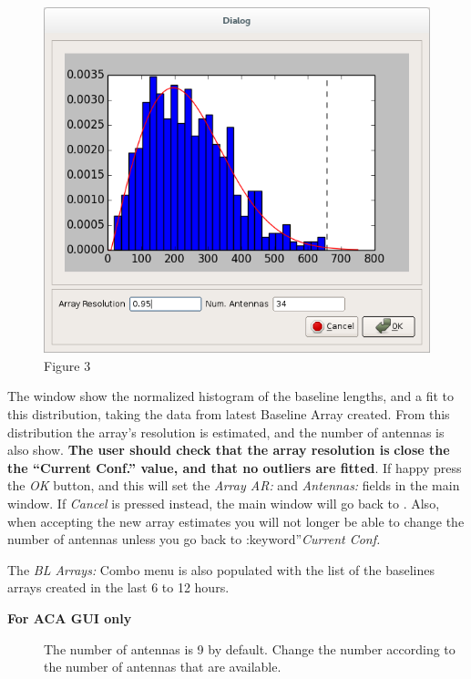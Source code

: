\documentclass[a4paper,10pt,english]{sphinxmanual}
\begin{document}
\begin{figure}[htbp]
\centering
\capstart

\includegraphics{gWTO2__BL_002.png}
\caption{Figure 3}\label{usingwto:fig3}\end{figure}

The window show the normalized histogram of the baseline lengths, and a fit to
this distribution, taking the data from latest Baseline Array created.
From this distribution the array's resolution is estimated, and the number of
antennas is also show. \textbf{The user should check that the array resolution is}
\textbf{close the the ``Current Conf.'' value, and that no outliers are fitted}. If
happy press the \emph{OK} button, and this will set the
\emph{Array AR:} and \emph{Antennas:} fields
in the main window. If \emph{Cancel} is pressed instead, the main window
will go back to . Also, when accepting the new array
estimates you will not longer be able to change the number of antennas unless
you go back to :keyword''\emph{Current Conf.}

The \emph{BL Arrays:} Combo menu is also populated with the list of the
baselines arrays created in the last 6 to 12 hours.
\begin{description}
\item[{\textbf{For ACA GUI only}}] \leavevmode
The number of antennas is 9 by default. Change the number according to the
number of antennas that are available.

\end{description}
\end{document}
